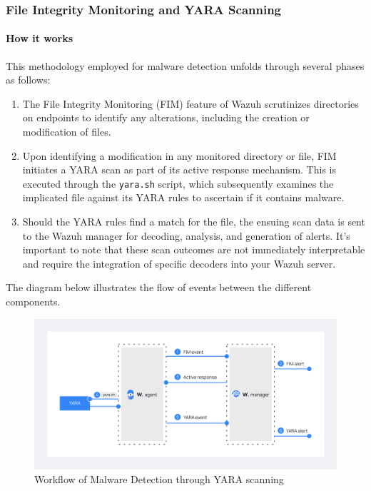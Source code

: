 \subsubsection{File Integrity Monitoring and YARA Scanning}
\paragraph{How it works}
This methodology employed for malware detection unfolds through several phases as follows:

\begin{enumerate}
    \item The File Integrity Monitoring (FIM) feature of Wazuh scrutinizes directories on endpoints to identify any alterations, including the creation or modification of files.
    
    \item Upon identifying a modification in any monitored directory or file, FIM initiates a YARA scan as part of its active response mechanism. This is executed through the \texttt{yara.sh} script, which subsequently examines the implicated file against its YARA rules to ascertain if it contains malware.
    
    \item Should the YARA rules find a match for the file, the ensuing scan data is sent to the Wazuh manager for decoding, analysis, and generation of alerts. It's important to note that these scan outcomes are not immediately interpretable and require the integration of specific decoders into your Wazuh server.
\end{enumerate}

The diagram below illustrates the flow of events between the different components.
\begin{figure}[H]
    \centering
    \includegraphics[width=\textwidth]{images/malware-detection/yara/flow.png}
    \caption{Workflow of Malware Detection through YARA scanning}
    \label{fig:yara-flow}
\end{figure}

